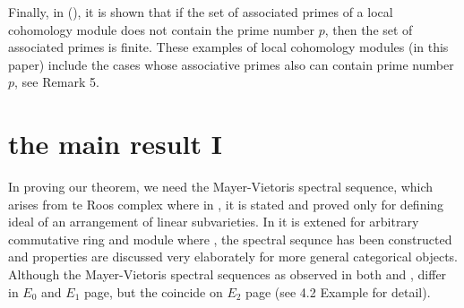 \documentclass[10pt]{amsart}
\theoremstyle{plain}
\theoremstyle{definition}
\newcommand{\ideal}[1]{\mathfrak{#1}}
\newcommand{\m}{\ideal{m}}
\newcommand{\n}{\ideal{n}}
\begin{document}
Finally, in (\cite{Nu3}), it is shown that if the set of associated primes of a local cohomology module does not contain the prime number $p$, then the set of associated primes is finite. These examples of local cohomology modules (in this paper) include the cases whose associative primes also can contain prime number $p$, see Remark 5.

\section{the main result I}







In proving our theorem, we need the Mayer-Vietoris spectral sequence, which arises from te Roos complex \cite{Roo} where in \cite{AGZ}, it is stated and proved only for defining ideal of an arrangement of linear subvarieties. In \cite{Ly4} it is extened for arbitrary commutative ring and module where \cite{ABZ}, the spectral sequnce has been constructed and properties are discussed very elaborately for more general categorical objects. Although the Mayer-Vietoris spectral sequences as observed in both \cite{AGZ} and \cite{Ly4}, differ in $E_0$ and $E_1$ page, but the coincide on $E_2$ page (see 4.2 Example \cite{ABZ} for detail).  
\end{document}
